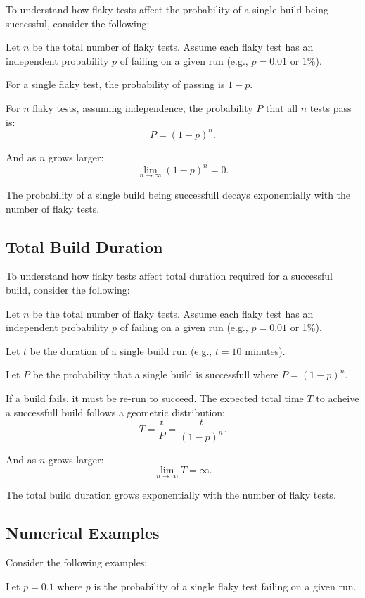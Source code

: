 \documentclass[letterpaper]{article}
\begin{document}
To understand how flaky tests affect the probability of a single build being successful, consider the following:

\setlength{\parskip}{1em}

Let \( n \) be the total number of flaky tests. Assume each flaky test has an independent probability \( p \) of failing on a given run (e.g., \( p = 0.01 \) or 1\%).

For a single flaky test, the probability of passing is \( 1 - p \).

For \( n \) flaky tests, assuming independence, the probability \( P \) that all \( n \) tests pass is:
\[
P = (1 - p)^n.
\]

And as \( n \) grows larger:
\[
\lim_{n \to \infty} (1 - p)^n = 0.
\]

The probability of a single build being successfull decays exponentially with the number of flaky tests.

\subsection{Total Build Duration}
To understand how flaky tests affect total duration required for a successful build, consider the following:

Let \( n \) be the total number of flaky tests. Assume each flaky test has an independent probability \( p \) of failing on a given run (e.g., \( p = 0.01 \) or 1\%).

Let \( t \) be the duration of a single build run (e.g., \( t = 10 \) minutes).

Let \( P \) be the probability that a single build is successfull where \( P = (1 - p)^n \).

If a build fails, it must be re-run to succeed. The expected total time \(T\) to acheive a successfull build follows a geometric distribution:
\[
T = \frac{t}{P} = \frac{t}{(1 - p)^n}.
\]

And as \( n \) grows larger:
\[
\lim_{n \to \infty} T = \infty.
\]

The total build duration grows exponentially with the number of flaky tests. 


\subsection{Numerical Examples}

Consider the following examples:

 Let \( p = 0.1 \) where \(p\) is the probability of a single flaky test failing on a given run.
\end{document}
